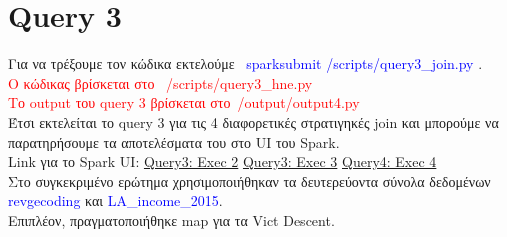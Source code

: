 \documentclass{article}
\begin{document}
\vspace{1\baselineskip}

\section{Query 3}

Για να τρέξουμε τον κώδικα εκτελούμε  \textcolor{blue}{spark\-submit /scripts/query3_join.py} . \\
\textcolor{red}{Ο κώδικας βρίσκεται στο  /scripts/query3_hne.py} \\
\textcolor{red}{Το output του query 3 βρίσκεται στο /output/output4.py} \\
Έτσι εκτελείται το query 3 για τις 4 διαφορετικές στρατιγηκές join και μπορούμε να παρατηρήσουμε τα αποτελέσματα του στο UI του Spark. \\

Link για το Spark UI: 
\href{http://83.212.81.191:18080/history/application_1705357398960_0014/jobs/} {Query3: Exec 2} 
\href{http://83.212.81.191:18080/history/application_1705357398960_0015/jobs/} {Query3: Exec 3} 
\href{http://83.212.81.191:18080/history/application_1705357398960_0016/jobs/} {Query4: Exec 4} \\
Στο συγκεκριμένο ερώτημα χρησιμοποιήθηκαν τα δευτερεύοντα σύνολα δεδομένων 
\textcolor{blue}{revgecoding} και \textcolor{blue}{LA\_income\_2015}. \\
Επιπλέον, πραγματοποιήθηκε map για τα Vict  Descent. \\
\end{document}
